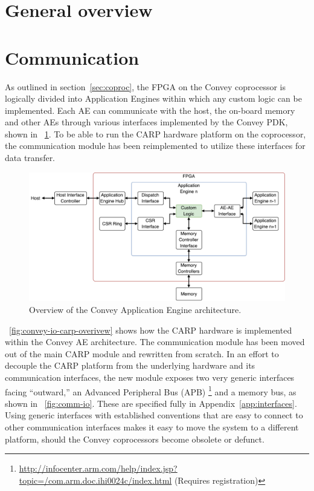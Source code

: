 \section{General overview}


\clearpage

\section{Communication}
\label{sec:communication}

As outlined in section~\ref{sec:coproc}, the FPGA on the Convey coprocessor is
logically divided into Application Engines within which any custom logic can be
implemented. Each AE can communicate with the host, the on-board memory and
other AEs through various interfaces implemented by the Convey PDK, shown in
\figurename~\ref{fig:convey-ae-io-overview}. To be able to run the CARP hardware
platform on the coprocessor, the communication module has been reimplemented to
utilize these interfaces for data transfer.

\begin{figure}[ht]
  \centering
  \includegraphics[width=\linewidth]{fig/convey-ae-io-overview}
  \caption{Overview of the Convey Application Engine architecture.}
  \label{fig:convey-ae-io-overview}
\end{figure}

\figurename~\ref{fig:convey-io-carp-overivew} shows how the CARP hardware is
implemented within the Convey AE architecture. The communication module has been
moved out of the main CARP module and rewritten from scratch. In an effort to
decouple the CARP platform from the underlying hardware and its communication
interfaces, the new module exposes two very generic interfaces facing
``outward,'' an Advanced Peripheral Bus (APB)
\footnote{\url{http://infocenter.arm.com/help/index.jsp?topic=/com.arm.doc.ihi0024c/index.html}
(Requires registration)} and a memory bus, as shown in
\figurename~\ref{fig:comm-io}. These are specified fully in
Appendix~\ref{app:interfaces}. Using generic interfaces with established
conventions that are easy to connect to other communication interfaces makes it
easy to move the system to a different platform, should the Convey coprocessors
become obsolete or defunct.

